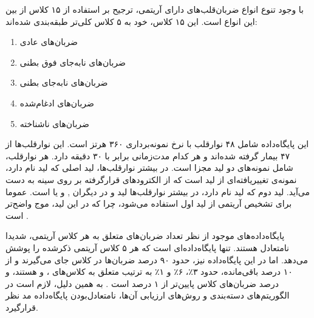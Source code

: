 با وجود تنوع انواع ضربان‌قلب‌های دارای آریتمی، ترجیح  بر استفاده از ۱۵ کلاس از بین این انواع است. این ۱۵ کلاس، خود به ۵ کلاس کلی‌تر طبقه‌بندی شده‌اند: 
\begin{enumerate}
	\item ضربان‌های عادی 
	\item ضربان‌های نابه‌جای فوق بطنی 
	\item ضربان‌های نابه‌جای بطنی 
	\item ضربان‌‌های ادغام‌شده 
	\item ضربان‌های ناشناخته 
\end{enumerate}

این پایگاه‌داده‌ شامل ۴۸ نوارقلب با نرخ نمونه‌برداری ۳۶۰ هرتز است. این نوارقلب‌ها از ۴۷ بیمار گرفته شده‌اند و هر کدام مدت‌زمانی برابر با ۳۰ دقیقه دارد. هر نوارقلب، شامل نمونه‌های دو لید مجزا است. در بیشتر نوارقلب‌ها، لید اصلی که لید  نام دارد، نمونه‌ی تغییریافته‌ای از لید  است که از الکترودهای قرارگرفته بر روی سینه به دست می‌آید. لید دوم که لید  نام دارد، در بیشتر نوارقلب‌ها لید  و در دیگران ,  و یا  است. عموما برای تشخیص آریتمی از لید اول  استفاده می‌شود، چرا که در این لید، موج  واضح‌تر است \cite{ECGSurvey}.

پایگاه‌داده‌های موجود از نظر تعداد ضربان‌های متعلق به هر کلاس آریتمی، شدیدا نامتعادل هستند.  تنها پایگاه‌داده‌ای است که هر ۵ کلاس آریتمی ذکرشده را پوشش می‌دهد. اما در این پایگاه‌داده نیز، حدود ۹۰ درصد ضربان‌ها در کلاس  جای می‌گیرند و از ۱۰ درصد باقی‌مانده، حدود ۳٪، ۶٪ و ۱٪ به ترتیب متعلق به کلاس‌های ،  و  هستند، و درصد ضربان‌های کلاس  پایین‌تر از ۱ درصد است \cite{Mondejar}. به همین دلیل، لازم است در الگوریتم‌های دسته‌بندی و روش‌های ارزیابی آن‌ها، نامتعادل‌بودن پایگاه‌داده مد نظر قرارگیرد.

